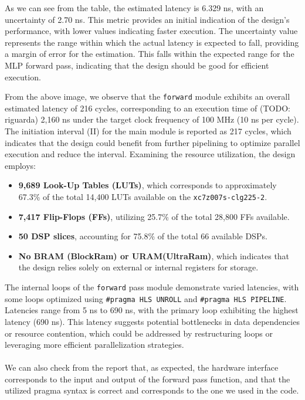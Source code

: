 \documentclass{article}
\begin{document}
As we can see from the table, the estimated latency is 6.329 ns, with an uncertainty of 2.70 ns. This metric provides an initial indication of the design's performance, with lower values indicating faster execution. The uncertainty value represents the range within which the actual latency is expected to fall, providing a margin of error for the estimation. This falls within the expected range for the MLP forward pass, indicating that the design should be good for efficient execution.


From the above image, we observe that the \texttt{forward} module exhibits an overall estimated latency of 216 cycles, corresponding to an execution time of (TODO: riguarda) 2,160 ns under the target clock frequency of 100 MHz (10 ns per cycle). The initiation interval (II) for the main module is reported as 217 cycles, which indicates that the design could benefit from further pipelining to optimize parallel execution and reduce the interval. Examining the resource utilization, the design employs:
\begin{itemize}
    \item \textbf{9,689 Look-Up Tables (LUTs)}, which corresponds to approximately 67.3\% of the total 14,400 LUTs available on the \texttt{xc7z007s-clg225-2}.
    \item \textbf{7,417 Flip-Flops (FFs)}, utilizing 25.7\% of the total 28,800 FFs available.
    \item \textbf{50 DSP slices}, accounting for 75.8\% of the total 66 available DSPs.
    \item \textbf{No BRAM (BlockRam) or URAM(UltraRam)}, which indicates that the design relies solely on external or internal registers for storage.
\end{itemize}

The internal loops of the \texttt{forward} pass module demonstrate varied latencies, with some loops optimized using \texttt{\#pragma HLS UNROLL} and \texttt{\#pragma HLS PIPELINE}. Latencies range from 5 ns to 690 ns, with the primary loop exhibiting the highest latency (690 ns). This latency suggests potential bottlenecks in data dependencies or resource contention, which could be addressed by restructuring loops or leveraging more efficient parallelization strategies.
\\\\We can also check from the report that, as expected, the hardware interface corresponds to the input and output of the forward pass function, and that the utilized pragma syntax is correct and corresponds to the one we used in the code.
\end{document}
